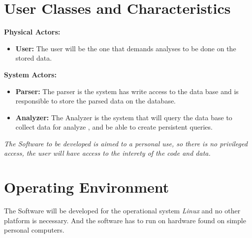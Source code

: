 \documentclass{scrreprt}
\begin{document}
\section{User Classes and Characteristics}

\textbf{Physical Actors:}\\
\begin{itemize}
 \item \textbf{User:} The user will be the one that demands analyses to be done
   on the stored data.
\end{itemize}
\textbf{System Actors:}\\
\begin{itemize}
 \item \textbf{Parser:} The parser is the system has write access to the data
   base and is responsible to store the parsed data on the database.
 \item \textbf{Analyzer:} The Analyzer is the system that will query the data
   base to collect data for analyze , and be able to create persistent queries.
\end{itemize}

\textit{The Software to be developed is aimed to a personal use, so there is no privileged access, the user will have access to the interety of the code and data.}
\section{Operating Environment}
The Software will be developed for the operational system \textit{Linux} and no
other platform is necessary.
And the software has to run on hardware found on simple personal computers.
\end{document}
